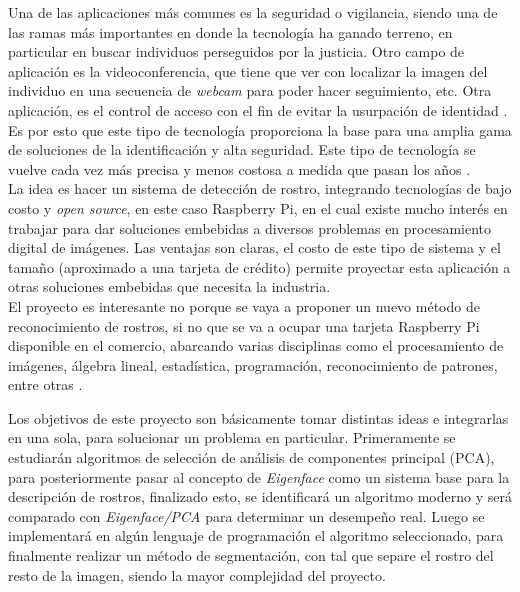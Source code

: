 \documentclass[letterpaper,12pt]{article}
\begin{document}
Una de las aplicaciones más comunes es la seguridad o vigilancia, siendo una de las ramas más importantes en donde la tecnología ha ganado terreno, en particular en buscar individuos perseguidos por la justicia\cite{UCarlosIII}. Otro campo de aplicación es la videoconferencia, que tiene que ver con localizar la imagen del individuo en una secuencia de \textit{webcam} para poder hacer seguimiento, etc. Otra aplicación, es el control de acceso con el fin de evitar la usurpación de identidad \cite{VniversitatDValencia}. Es por esto que este tipo de tecnología proporciona la base para una amplia gama de soluciones de la identificación y alta seguridad. Este tipo de tecnología se vuelve cada vez más precisa y menos costosa a medida que pasan los años \cite{Bovik}.\\

La idea es hacer un sistema de detección de rostro, integrando tecnologías de bajo costo y \textit{open source}, en este caso Raspberry Pi, en el cual existe mucho interés en trabajar para dar soluciones embebidas a diversos problemas en  procesamiento digital de imágenes. Las ventajas son claras, el costo de este tipo de sistema y el tamaño (aproximado a una tarjeta de crédito) permite proyectar esta aplicación a otras soluciones embebidas que necesita la industria.\\

El proyecto es interesante no porque se vaya a proponer un nuevo método de reconocimiento de rostros, si no que se va a ocupar una tarjeta Raspberry Pi disponible en el comercio, abarcando varias disciplinas como el procesamiento de imágenes, álgebra lineal, estadística, programación, reconocimiento de patrones, entre otras \cite{Paper01}.

\newpage
Los objetivos de este proyecto son básicamente tomar distintas ideas e integrarlas en una sola, para solucionar un problema en particular. Primeramente se estudiarán algoritmos de selección de análisis de componentes principal (PCA), para posteriormente pasar al concepto de \textit{Eigenface} como un sistema base para la descripción de rostros, finalizado esto, se identificará un algoritmo moderno y será comparado con \textit{Eigenface/PCA} para determinar un desempeño real. Luego se implementará en algún lenguaje de programación el algoritmo seleccionado, para finalmente  realizar un método de segmentación, con tal que separe el rostro del resto de la imagen, siendo la mayor complejidad del proyecto.


\newpage
\end{document}
